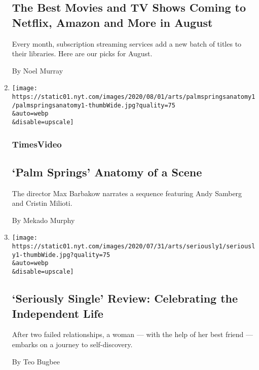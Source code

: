 \begin{enumerate}
{  \subsection{The Best Movies and TV Shows Coming to Netflix, Amazon and
  More in
  August}\label{the-best-movies-and-tv-shows-coming-to-netflix-amazon-and-more-in-august}}

  Every month, subscription streaming services add a new batch of titles
  to their libraries. Here are our picks for August.

  By Noel Murray
\item
  \href{/video/movies/100000007265338/palm-springs-scene.html}{}

  \texttt{[image: https://static01.nyt.com/images/2020/08/01/arts/palmspringsanatomy1/palmspringsanatomy1-thumbWide.jpg?quality=75\\\&auto=webp\\\&disable=upscale]}

  \hypertarget{timesvideo}{%
  \subsubsection{TimesVideo}\label{timesvideo}}

  \hypertarget{palm-springs--anatomy-of-a-scene}{%
  \subsection{`Palm Springs' \textbar{} Anatomy of a
  Scene}\label{palm-springs--anatomy-of-a-scene}}

  The director Max Barbakow narrates a sequence featuring Andy Samberg
  and Cristin Milioti.

  By Mekado Murphy
\item
  \href{/2020/07/31/movies/seriously-single-review.html}{}

  \texttt{[image: https://static01.nyt.com/images/2020/07/31/arts/seriously1/seriously1-thumbWide.jpg?quality=75\\\&auto=webp\\\&disable=upscale]}

  \hypertarget{seriously-single-review-celebrating-the-independent-life}{%
  \subsection{`Seriously Single' Review: Celebrating the Independent
  Life}\label{seriously-single-review-celebrating-the-independent-life}}

  After two failed relationships, a woman --- with the help of her best
  friend --- embarks on a journey to self-discovery.

  By Teo Bugbee
\end{enumerate}

